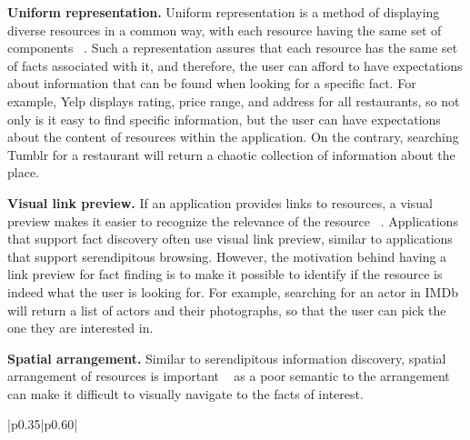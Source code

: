 {{\textbf{Uniform representation.} Uniform representation is a method of displaying diverse resources in a common way, with each resource having the same set of components ~\cite{herrera}. Such a representation assures that each resource has the same set of facts associated with it, and therefore, the user can afford to have expectations about information that can be found when looking for a specific fact. For example, Yelp displays rating, price range, and address for all restaurants, so not only is it easy to find specific information, but the user can have expectations about the content of resources within the application. On the contrary, searching Tumblr for a restaurant will return a chaotic collection of information about the place. 



\textbf{Visual link preview.} If an application provides links to resources, a visual preview makes it easier to recognize the relevance of the resource ~\cite{abrams}. Applications that support fact discovery often use visual link preview, similar to applications that support serendipitous browsing. However, the motivation behind having a link preview for fact finding is to make it possible to identify if the resource is indeed what the user is looking for. For example, searching for an actor in IMDb will return a list of actors and their photographs, so that the user can pick the one they are interested in.

\textbf{Spatial arrangement.} Similar to serendipitous information discovery, spatial arrangement of resources is important ~\cite{abrams} as a poor semantic to the arrangement can make it difficult to visually navigate to the facts of interest.

\begin{table}[ht!]
\caption{Exploration Mechanisms}
\label{table:exploration}
\begin{tabular}{{|p{0.35\linewidth}|p{0.60\linewidth}|}}
\hline


\end{tabular}
\end{table}}}
